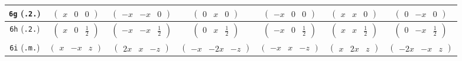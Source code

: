 \documentclass[fleqn,9pt,landscape]{jsarticle}
\begin{document}
\begin{center}
\begin{longtable}{ccccccc}
{\tt 6g} ({\tt .2.}) & $ \begin{pmatrix} x & 0 & 0 \end{pmatrix} $ & $ \begin{pmatrix} - x & - x & 0 \end{pmatrix} $ & $ \begin{pmatrix} 0 & x & 0 \end{pmatrix} $ & $ \begin{pmatrix} - x & 0 & 0 \end{pmatrix} $ & $ \begin{pmatrix} x & x & 0 \end{pmatrix} $ & $ \begin{pmatrix} 0 & - x & 0 \end{pmatrix} $ \\ \hline
{\tt 6h} ({\tt .2.}) & $ \begin{pmatrix} x & 0 & \frac{1}{2} \end{pmatrix} $ & $ \begin{pmatrix} - x & - x & \frac{1}{2} \end{pmatrix} $ & $ \begin{pmatrix} 0 & x & \frac{1}{2} \end{pmatrix} $ & $ \begin{pmatrix} - x & 0 & \frac{1}{2} \end{pmatrix} $ & $ \begin{pmatrix} x & x & \frac{1}{2} \end{pmatrix} $ & $ \begin{pmatrix} 0 & - x & \frac{1}{2} \end{pmatrix} $ \\ \hline
{\tt 6i} ({\tt .m.}) & $ \begin{pmatrix} x & - x & z \end{pmatrix} $ & $ \begin{pmatrix} 2 x & x & - z \end{pmatrix} $ & $ \begin{pmatrix} - x & - 2 x & - z \end{pmatrix} $ & $ \begin{pmatrix} - x & x & - z \end{pmatrix} $ & $ \begin{pmatrix} x & 2 x & z \end{pmatrix} $ & $ \begin{pmatrix} - 2 x & - x & z \end{pmatrix} $ \\ \hline

\end{longtable}
\end{center}
\end{document}
